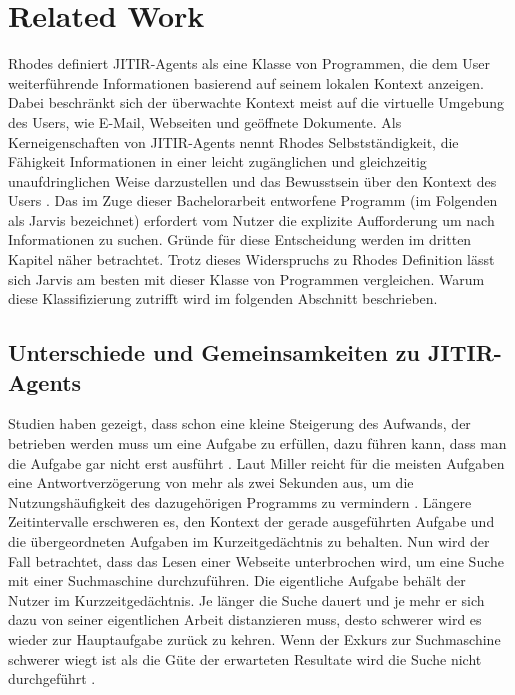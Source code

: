 \section{Related Work}
Rhodes \cite{rhodes2000just} definiert JITIR-Agents als eine Klasse von Programmen, die dem User weiterführende Informationen basierend auf seinem lokalen Kontext anzeigen. Dabei beschränkt sich der überwachte Kontext meist auf die virtuelle Umgebung des Users, wie E-Mail, Webseiten und geöffnete Dokumente. Als Kerneigenschaften von JITIR-Agents nennt Rhodes Selbstständigkeit, die Fähigkeit Informationen in einer leicht zugänglichen und gleichzeitig unaufdringlichen Weise darzustellen und das Bewusstsein über den Kontext des Users \cite{rhodes2000thesis}.
Das im Zuge dieser Bachelorarbeit entworfene Programm (im Folgenden als Jarvis bezeichnet) erfordert vom Nutzer die explizite Aufforderung um nach Informationen zu suchen. Gründe für diese Entscheidung werden im dritten Kapitel näher betrachtet. Trotz dieses Widerspruchs zu Rhodes Definition lässt sich Jarvis am besten mit dieser Klasse von Programmen vergleichen. Warum diese Klassifizierung zutrifft wird im folgenden Abschnitt beschrieben.

\subsection{Unterschiede und Gemeinsamkeiten zu JITIR-Agents}
Studien haben gezeigt, dass schon eine kleine Steigerung des Aufwands, der betrieben werden muss um eine Aufgabe zu erfüllen, dazu führen kann, dass man die Aufgabe gar nicht erst ausführt \cite{rhodes2000just}. Laut Miller reicht für die meisten Aufgaben eine Antwortverzögerung von mehr als zwei Sekunden aus, um die Nutzungshäufigkeit des dazugehörigen Programms zu vermindern \cite{miller1968response}. Längere Zeitintervalle erschweren es, den Kontext der gerade ausgeführten Aufgabe und die übergeordneten Aufgaben im Kurzeitgedächtnis zu behalten. Nun wird der Fall betrachtet, dass das Lesen einer Webseite unterbrochen wird, um eine Suche mit einer Suchmaschine durchzuführen. Die eigentliche Aufgabe behält der Nutzer im Kurzzeitgedächtnis. Je länger die Suche dauert und je mehr er sich dazu von seiner eigentlichen Arbeit distanzieren muss, desto schwerer wird es wieder zur Hauptaufgabe zurück zu kehren. Wenn der Exkurs zur Suchmaschine schwerer wiegt ist als die Güte der erwarteten Resultate wird die Suche nicht durchgeführt \cite{rhodes2000just}.

